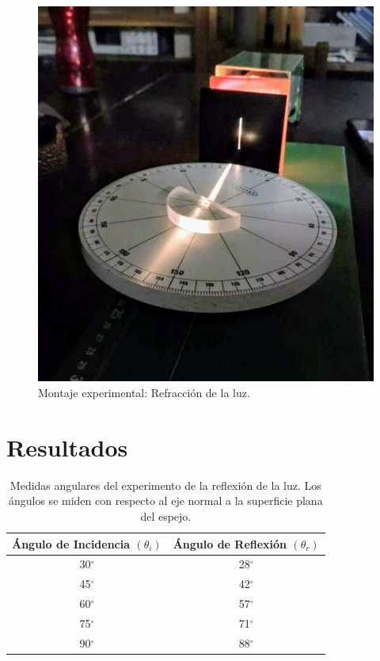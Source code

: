 \documentclass[
aps,
reprint,
amsmath, amssymb,
superscriptaddress,
]{revtex4-2}
\begin{document}
\begin{figure}
\centering
\includegraphics[width=0.5\columnwidth]{img/img1.pdf}
\caption{\label{fig:img_1} Montaje experimental: Refracción de la luz.}
\end{figure}

\section{\label{sec:resultados}Resultados}
\begin{table}[H]%
    \caption{\label{tab:tabla1} Medidas angulares del experimento de la reflexión de la luz. Los ángulos se miden con respecto al eje normal a la superficie plana del espejo.}
     \begin{ruledtabular}
     \begin{tabular}{cc}
        Ángulo de Incidencia $(\theta_i)$ & Ángulo de Reflexión $(\theta_r)$ \\
        \hline
        30$^{\circ}$ & 28$^{\circ}$ \\
        45$^{\circ}$ & 42$^{\circ}$ \\
        60$^{\circ}$ & 57$^{\circ}$ \\
        75$^{\circ}$ & 71$^{\circ}$\\
        90$^{\circ}$ & 88$^{\circ}$
     \end{tabular}
     \end{ruledtabular}
\end{table}
\end{document}

